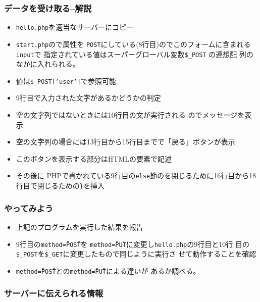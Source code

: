 \begin{frame}[containsverbatim]
 \frametitle{データを受け取る--解説}
 \begin{itemize}
  \item  \texttt{hello.php}を適当なサーバーにコピー
  \item \texttt{start.php}ので属性を
       \texttt{POST}にしている(8行目)のでこのフォームに含まれる\texttt{input}で
       指定されている値はスーパーグローバル変数\texttt{\$\_POST} の連想配
       列のなかに入れられる。
  \item 値は\texttt{\$\_POST['user']}で参照可能
  \item 9行目で入力された文字があるかどうかの判定
  \item 空の文字列ではないときには10行目の文が実行される
       のでメッセージを表示
  \item 空の文字列の場合には13行目から15行目までで「戻る」ボタンが表示
  \item このボタンを表示する部分はHTMLの要素で記述
  \item その後に
       PHPで書かれている9行目の\texttt{else}節のを閉じるために16行目から18
       行目で閉じるための\texttt{\}}を挿入
 \end{itemize}
\end{frame}
\begin{frame}[containsverbatim]
 \frametitle{やってみよう}
 \begin{itemize}
  \item 上記のプログラムを実行した結果を報告
	\item 9行目の\texttt{method=\"POST\"}を
				\texttt{method=\"PUT\"}に変更し\texttt{hello.php}の9行目と10行
				目の\Verb+$_POST+を\Verb+$_GET+に変更したもので同じように実行さ
				せて動作することを確認
	\item \texttt{method=\"POST\"}との\texttt{method=\"PUT\"}による違いが
				あるか調べる。
 \end{itemize}
\end{frame}
\begin{frame}[containsverbatim]
 \frametitle{サーバーに伝えられる情報}
\end{frame}
